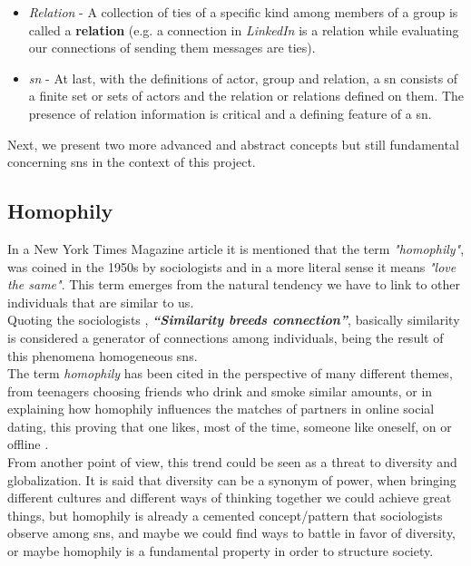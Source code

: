 \begin{itemize}
    \item \emph{Relation} - A collection of ties of a specific kind among members of a group is called a \textbf{relation} (e.g. a connection in \textit{LinkedIn} is a relation while evaluating our connections of sending them messages are ties).
    \item \emph{\gls{sn}} - At last, with the definitions of actor, group and relation, a \gls{sn} consists of a finite set or sets of actors and the relation or relations defined on them. The presence of relation information is critical and a defining feature of a \gls{sn}.
\end{itemize}

Next, we present two more advanced and abstract concepts but still fundamental concerning \glspl{sn} in the context of this project.

\subsection*{Homophily}

In a New York Times Magazine article \citep{nytmagazinehomop} it is mentioned that the term \textit{"homophily"}, was coined in the 1950s by sociologists and in a more literal sense it means \textit{"love the same"}. This term emerges from the natural tendency we have to link to other individuals that are similar to us.\\
\indent Quoting the sociologists \citep{mcpherson2001birds}, \textbf{\textit{“Similarity breeds connection”}}, basically similarity is considered a generator of connections among individuals, being the result of this phenomena homogeneous \glspl{sn}.\\
\indent The term \textit{homophily} has been cited in the perspective of many different themes, from teenagers choosing friends who drink and smoke similar amounts, or in explaining how homophily influences the matches of partners in online social dating, this proving that one likes, most of the time, someone like oneself, on or offline \citep{fiore2005homophily}.\\
\indent From another point of view, this trend could be seen as a threat to diversity and globalization. It is said that diversity can be a synonym of power, when bringing different cultures and different ways of thinking together we could achieve great things, but homophily is already a cemented concept/pattern that sociologists observe among \glspl{sn}, and maybe we could find ways to battle in favor of diversity, or maybe homophily is a fundamental property in order to structure society.

